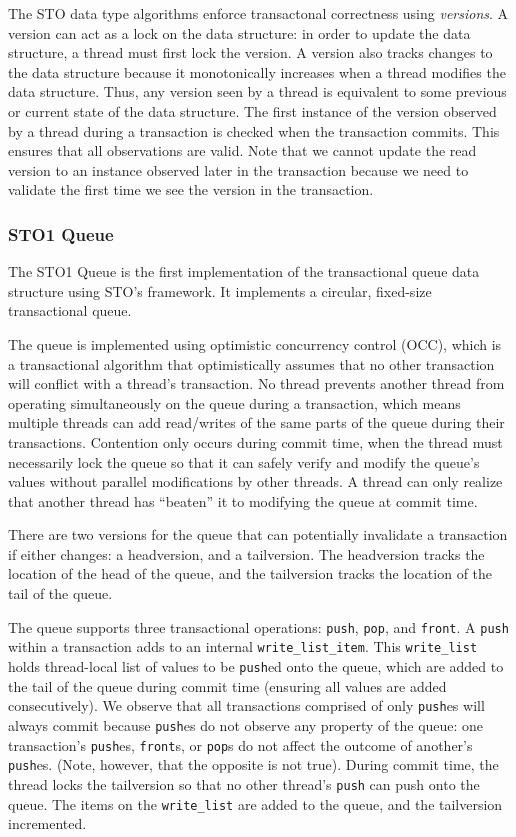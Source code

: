 The STO data type algorithms enforce transactonal correctness using \emph{versions}. A version can act as a lock on the data structure: in order to update the data structure, a thread must first lock the version. A version also tracks changes to the data structure because it monotonically increases when a thread modifies the data structure. Thus, any version seen by a thread is equivalent to some previous or current state of the data structure. The first instance of the version observed by a thread during a transaction is checked when the transaction commits. This ensures that all observations are valid. Note that we cannot update the read version to an instance observed later in the transaction because we need to validate the first time we see the version in the transaction. 


\subsubsection{STO1 Queue}

The STO1 Queue is the first implementation of the transactional queue data structure using STO’s framework. It implements a circular, fixed-size transactional queue.

The queue is implemented using optimistic concurrency control (OCC), which is a transactional algorithm that optimistically assumes that no other transaction will conflict with a thread’s transaction. No thread prevents another thread from operating simultaneously on the queue during a transaction, which means multiple threads can add read/writes of the same parts of the queue during their transactions. Contention only occurs during commit time, when the thread must necessarily lock the queue so that it can safely verify and modify the queue’s values without parallel modifications by other threads. A thread can only realize that another thread has “beaten” it to modifying the queue at commit time.

There are two versions for the queue that can potentially invalidate a transaction if either changes: a headversion, and a tailversion. The headversion tracks the location of the head of the queue, and the tailversion tracks the location of the tail of the queue.

The queue supports three transactional operations: \texttt{push}, \texttt{pop}, and \texttt{front}. A \texttt{push} within a transaction adds to an internal \texttt{write\_list\_item}. This \texttt{write\_list} holds thread-local list of values to be \texttt{push}ed onto the queue, which are added to the tail of the queue during commit time (ensuring all values are added consecutively). We observe that all transactions comprised of only \texttt{push}es will always commit because \texttt{push}es do not observe any property of the queue: one transaction’s \texttt{push}es, \texttt{front}s, or \texttt{pop}s do not affect the outcome of another’s \texttt{push}es. (Note, however, that the opposite is not true). During commit time, the thread locks the tailversion so that no other thread’s \texttt{push} can push onto the queue. The items on the \texttt{write\_list} are added to the queue, and the tailversion incremented.

